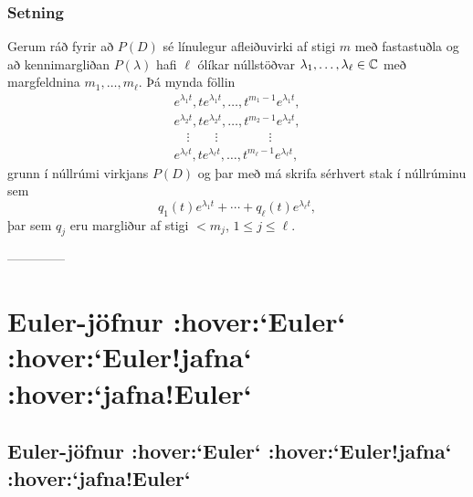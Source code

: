 \subsubsection{Setning}
Gerum ráð fyrir að $P(D)$ sé línulegur afleiðuvirki af stigi $m$
með fasta\-stuðla og  að kennimargliðan $P(\lambda)$  hafi $\ell$ ólíkar
núllstöðvar  
$\lambda_1,\dots,\lambda_\ell\in {\mathbb C}$ með margfeldnina
$m_1,\dots,m_\ell$.  Þá mynda 
föllin
\begin{gather*}
e^{\lambda_1t}, te^{\lambda_1t},\dots, t^{m_1-1}e^{\lambda_1t},\\
e^{\lambda_2t}, te^{\lambda_2t},\dots, t^{m_2-1}e^{\lambda_2t},\\
\quad \vdots\qquad \vdots \qquad \qquad \vdots\\
e^{\lambda_\ell t}, te^{\lambda_\ell t},\dots, t^{m_\ell-1}e^{\lambda_\ell t},
\end{gather*}
grunn í núllrúmi virkjans $P(D)$ og þar með má skrifa 
sérhvert stak í núllrúminu sem 
$$
q_1(t)e^{\lambda_1t}+\cdots+q_\ell(t)e^{\lambda_\ell t},
$$
þar sem $q_j$ eru margliður af stigi $<m_j$, $1\leq j\leq \ell$.


--------------




 
\section{Euler-jöfnur :hover:`Euler` :hover:`Euler!jafna` :hover:`jafna!Euler`}

\subsection{Euler-jöfnur :hover:`Euler` :hover:`Euler!jafna` :hover:`jafna!Euler`}

